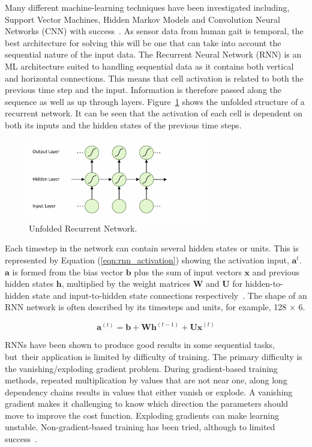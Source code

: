 Many different machine-learning techniques have been investigated including, Support Vector Machines, Hidden Markov Models and Convolution Neural Networks (CNN) with success~\cite{Labarriere2020}. As sensor data from human gait is temporal, the best architecture for solving this will be one that can take into account the sequential nature of the input data. The Recurrent Neural Network (RNN) is an ML architecture suited to handling sequential data as it contains both vertical and horizontal connections. This means that cell activation is related to both the previous time step and the input. Information is therefore passed along the sequence as well as up through layers. Figure~\ref{fig:rnn_structure} shows the unfolded structure of a recurrent network. It can be seen that the activation of each cell is dependent on both its inputs and the hidden states of the previous time steps.

\begin{figure}[!hbt]
    \centering
    \includegraphics[width=0.7\textwidth]{content/4-LSTM_Behaviour/lstm/rnn_structure.jpg}
    \caption{Unfolded Recurrent Network.}
    \label{fig:rnn_structure}
\end{figure}

Each timestep in the network can contain several hidden states or units. This is represented by Equation (\ref{eqn:rnn_activation}) showing the activation input, $\mathbf{a}^t$. $\mathbf{a}$ is formed from the bias vector $\mathbf{b}$ plus the sum of input vectors $\mathbf{x}$ and previous hidden states $\mathbf{h}$, multiplied by the weight matrices $\mathbf{W}$ and $\mathbf{U}$ for hidden-to-hidden state and input-to-hidden state connections respectively~\cite{Goodfellow2015}. The shape of an RNN network is often described by its timesteps and units, for example, 128 $\times$ 6.

\begin{equation}
    \mathbf{a}^{(t)} = \mathbf{b} + \mathbf{Wh}^{(t-1)} + \mathbf{Ux}^{(t)}
    \label{eqn:rnn_activation}
\end{equation}

RNNs have been shown to produce good results in some sequential tasks, but~their application is limited by difficulty of training. The primary difficulty is the vanishing/exploding gradient problem. During gradient-based training methods, repeated multiplication by values that are not near one, along long dependency chains results in values that either vanish or explode. A vanishing gradient makes it challenging to know which direction the parameters should move to improve the cost function. Exploding gradients can make learning unstable. Non-gradient-based training has been tried, although to limited success~\cite{Graves2012, Goodfellow2015}.

